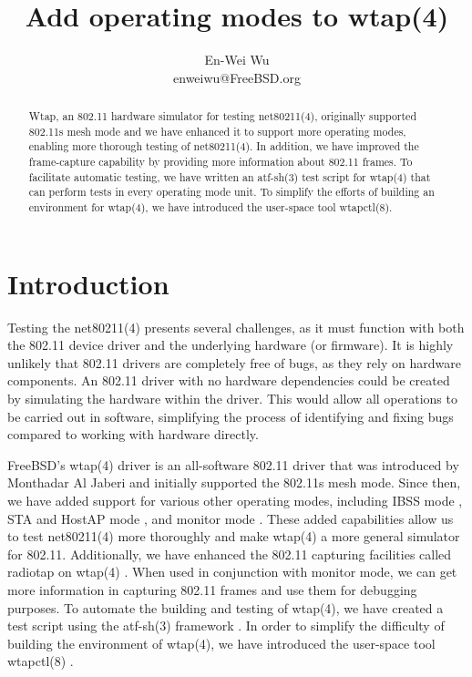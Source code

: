 \documentclass[conference]{IEEEtran}
\begin{document}
\title{Add operating modes to wtap(4)}
\author{
\rm En-Wei Wu \\
\rm enweiwu@FreeBSD.org \\
}

\author{
}

\maketitle

\begin{abstract}
Wtap, an 802.11 hardware simulator for testing net80211(4), originally supported 802.11s mesh mode and we have enhanced it to support more operating modes, enabling more thorough testing of net80211(4). In addition, we have improved the frame-capture capability by providing more information about 802.11 frames. To facilitate automatic testing, we have written an atf-sh(3) test script for wtap(4) that can perform tests in every operating mode unit. To simplify the efforts of building an environment for wtap(4), we have introduced the user-space tool wtapctl(8).
\end{abstract}

\section{Introduction}
Testing the net80211(4) presents several challenges, as it must function with both the 802.11 device driver and the underlying hardware (or firmware). It is highly unlikely that 802.11 drivers are completely free of bugs, as they rely on hardware components. An 802.11 driver with no hardware dependencies could be created by simulating the hardware within the driver. This would allow all operations to be carried out in software, simplifying the process of identifying and fixing bugs compared to working with hardware directly.

FreeBSD's wtap(4) driver is an all-software 802.11 driver that was introduced by Monthadar Al Jaberi \cite{commit:wtap_origin} and initially supported the 802.11s mesh mode. Since then, we have added support for various other operating modes, including IBSS mode \cite{commit:adhoc}, STA and HostAP mode \cite{commit:hostap}, and monitor mode \cite{commit:monitor}. These added capabilities allow us to test net80211(4) more thoroughly and make wtap(4) a more general simulator for 802.11. Additionally, we have enhanced the 802.11 capturing facilities called radiotap on wtap(4) \cite{commit:monitor}. When used in conjunction with monitor mode, we can get more information in capturing 802.11 frames and use them for debugging purposes. To automate the building and testing of wtap(4), we have created a test script using the atf-sh(3) framework \cite{commit:atf}. In order to simplify the difficulty of building the environment of wtap(4), we have introduced the user-space tool wtapctl(8) \cite{commit:wtapctl}.
\end{document}

